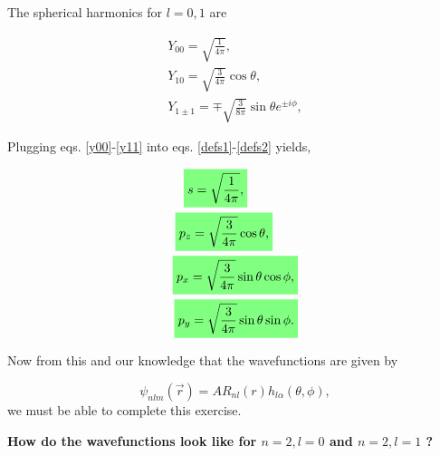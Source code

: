 \begin{questions}
\begin{solution}
  The spherical harmonics for $l=0,1$ are

  \begin{eqnarray}
      Y_{00} = \sqrt{\frac{1}{4\pi}}, \qquad \qquad \quad \label{y00}\\
      Y_{10} = \sqrt{\frac{3}{4\pi}}\cos{\theta}, \qquad \quad \label{y10}\\
      Y_{1\pm1}= \mp \sqrt{\frac{3}{8\pi}}\sin{\theta}e^{\pm i\phi}, \label{y11}
  \end{eqnarray}

  Plugging eqs. \ref{y00}-\ref{y11} into eqs. \ref{defs1}-\ref{defs2} yields,

  \begin{eqnarray}
      \hlgreen{s = \sqrt{\frac{1}{4\pi}},} \qquad \quad \quad\\
      \hlgreen{p_z = \sqrt{\frac{3}{4\pi}}\cos{\theta},} \qquad\\
      \hlgreen{p_x= \sqrt{\frac{3}{4\pi}}\sin{\theta}\cos{\phi},}\\
      \hlgreen{p_y = \sqrt{\frac{3}{4\pi}}\sin{\theta}\sin{\phi}.}
  \end{eqnarray}

  Now from this and our knowledge that the wavefunctions are given by

  \begin{equation}
    \psi_{nlm}(\vec{r}) =A R_{nl}(r)h_{l\alpha}(\theta,\phi),
  \end{equation}
  we must be able to complete this exercise.

  \textbf{How do the wavefunctions look like for $n=2,l=0$ and $n=2,l=1$ ?}


\end{solution}
\end{questions}
